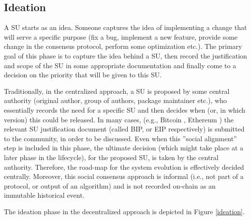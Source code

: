 \subsection{Ideation}
A SU starts as an idea. Someone captures the idea of implementing a change that will serve a specific purpose (fix a bug, implement a new feature, provide some change in the consensus protocol, perform some optimization etc.). 
The primary goal of this phase is to capture the idea behind a SU, then record the justification and scope of the SU in some appropriate documentation and finally come to a decision on the priority that will be given to this SU. 

Traditionally, in the centralized approach, a SU is proposed by some central authority (original author, group of authors, package maintainer etc.), who essentially records the need for a specific SU and then decides when (or, in which version) this could be released. In many cases, (e.g., Bitcoin \cite{bitcoin}, Ethereum \cite{ethereum}) the relevant SU justification document (called BIP, or EIP respectively) is submitted to the community, in order to be discussed. Even when this ''social alignment'' step is included in this phase, the ultimate decision (which might take place at a later phase in the lifecycle), for the proposed SU, is taken by the central authority. Therefore, the road-map for the system evolution is effectively decided centrally. Moreover, this social consensus approach is informal (i.e., not part of a protocol, or output of an algorithm) and is not recorded on-chain as an immutable historical event.

The ideation phase in the decentralized approach is depicted in Figure \ref{ideation}.

